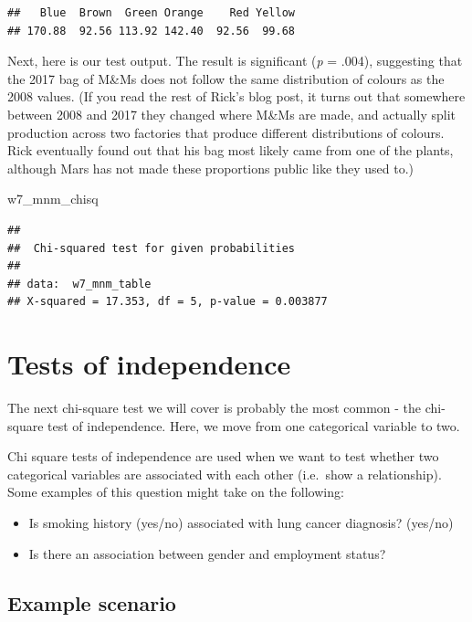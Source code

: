 \documentclass[
]{book}
\newenvironment{Shaded}{\begin{snugshade}}{\end{snugshade}}
\newcommand{\NormalTok}[1]{#1}
\providecommand{\tightlist}{%
  \setlength{\itemsep}{0pt}\setlength{\parskip}{0pt}}
\begin{document}
\begin{verbatim}
##   Blue  Brown  Green Orange    Red Yellow 
## 170.88  92.56 113.92 142.40  92.56  99.68
\end{verbatim}

Next, here is our test output. The result is significant (\emph{p} = .004), suggesting that the 2017 bag of M\&Ms does not follow the same distribution of colours as the 2008 values. (If you read the rest of Rick's blog post, it turns out that somewhere between 2008 and 2017 they changed where M\&Ms are made, and actually split production across two factories that produce different distributions of colours. Rick eventually found out that his bag most likely came from one of the plants, although Mars has not made these proportions public like they used to.)

\begin{Shaded}
\begin{Highlighting}[]
\NormalTok{w7\_mnm\_chisq}
\end{Highlighting}
\end{Shaded}

\begin{verbatim}
## 
##  Chi-squared test for given probabilities
## 
## data:  w7_mnm_table
## X-squared = 17.353, df = 5, p-value = 0.003877
\end{verbatim}

\section{Tests of independence}\label{tests-of-independence}

The next chi-square test we will cover is probably the most common - the chi-square test of independence. Here, we move from one categorical variable to two.

Chi square tests of independence are used when we want to test whether two categorical variables are associated with each other (i.e.~show a relationship). Some examples of this question might take on the following:

\begin{itemize}
\tightlist
\item
  Is smoking history (yes/no) associated with lung cancer diagnosis? (yes/no)
\item
  Is there an association between gender and employment status?
\end{itemize}

\subsection{Example scenario}\label{example-scenario}
\end{document}
